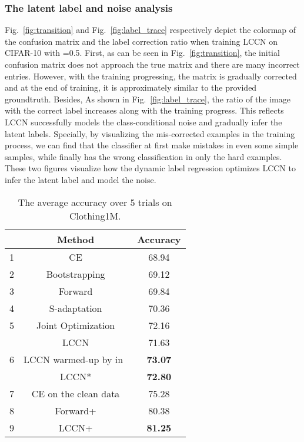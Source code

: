 \documentclass[journal]{IEEEtran}
\begin{document}
\subsubsection{The latent label and noise analysis}
Fig.~\ref{fig:transition} and Fig.~\ref{fig:label_trace} respectively depict the colormap of the confusion matrix and the label correction ratio when training LCCN on CIFAR-10 with =0.5. First, as can be seen in Fig.~\ref{fig:transition}, the initial confusion matrix does not approach the true matrix and there are many incorrect entries. However, with the training progressing, the matrix is gradually corrected and at the end of training, it is approximately similar to the provided groundtruth. Besides, As shown in Fig.~\ref{fig:label_trace}, the ratio of the image with the correct label increases along with the training progress. This reflects LCCN successfully models the class-conditional noise and gradually infer the latent labels. Specially, by visualizing the mis-corrected examples in the training process, we can find that the classifier at first make mistakes in even some simple samples, while finally has the wrong classification in only the hard examples. These two figures visualize how the dynamic label regression optimizes LCCN to infer the latent label and model the noise.

\begin{table} 
\caption{The average accuracy over 5 trials on Clothing1M.}
\begin{center}
{
    \begin{tabular}{ c | c | c }
    \hline
      & Method & Accuracy \\
     \hline
     \hline
     1 & CE & 68.94 \\
     \hline
     2 & Bootstrapping & 69.12\\
     \hline
     3 & Forward & 69.84 \\
     \hline
     4 & S-adaptation & 70.36 \\
     \hline
     5 & Joint Optimization & 72.16 \\
     \hline
     \multirow{3}{*}{6} & LCCN & 71.63 \\
     & LCCN warmed-up by  in~\cite{xiao2015learning}  & \textbf{73.07} \\
     & LCCN* & \textbf{72.80} \\
     \hline
     \hline
     7 & CE on the clean data & 75.28 \\
     \hline
     8 & Forward+ & 80.38 \\
     \hline
     9 & LCCN+ & \textbf{81.25} \\
     \hline
    \end{tabular}
}
\end{center}
\label{tab:clothing1M}
\end{table}
\end{document}
